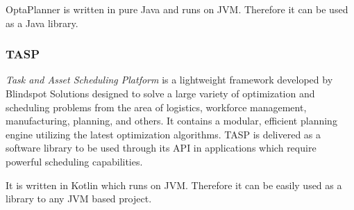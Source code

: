 OptaPlanner is written in pure Java and runs on JVM. Therefore it can be used as a Java library.

\subsubsection{TASP}\label{subsubsec:tasp}
\textit{Task and Asset Scheduling Platform} is a lightweight framework developed by Blindspot Solutions\cite{web:blindspot} designed to solve a large
variety of optimization and scheduling problems from the area of logistics, workforce management, manufacturing, planning, and others.
It contains a modular, efficient planning engine utilizing the latest optimization algorithms.
TASP is delivered as a software library to be used through its API in applications which require powerful scheduling capabilities.

It is written in Kotlin which runs on JVM. Therefore it can be easily used as a library to any JVM based project\@.